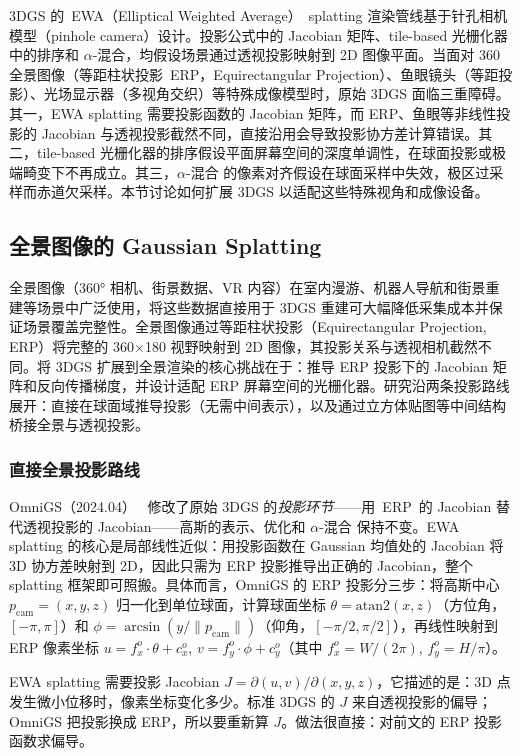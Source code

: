 3DGS 的~EWA（Elliptical Weighted Average）~splatting 渲染管线基于针孔相机模型（pinhole camera）设计。投影公式中的 Jacobian 矩阵、tile-based 光栅化器中的排序和 $\alpha$-混合，均假设场景通过透视投影映射到 2D 图像平面。当面对 360\textdegree{} 全景图像（等距柱状投影~ERP，Equirectangular Projection）、鱼眼镜头（等距投影）、光场显示器（多视角交织）等特殊成像模型时，原始 3DGS 面临三重障碍。其一，EWA splatting 需要投影函数的 Jacobian 矩阵，而 ERP、鱼眼等非线性投影的 Jacobian 与透视投影截然不同，直接沿用会导致投影协方差计算错误。其二，tile-based 光栅化器的排序假设平面屏幕空间的深度单调性，在球面投影或极端畸变下不再成立。其三，$\alpha$-混合 的像素对齐假设在球面采样中失效，极区过采样而赤道欠采样。本节讨论如何扩展 3DGS 以适配这些特殊视角和成像设备。

\subsection{全景图像的 Gaussian Splatting}

全景图像（360° 相机、街景数据、VR 内容）在室内漫游、机器人导航和街景重建等场景中广泛使用，将这些数据直接用于 3DGS 重建可大幅降低采集成本并保证场景覆盖完整性。全景图像通过等距柱状投影（Equirectangular Projection, ERP）将完整的 360\textdegree{}$\times$180\textdegree{} 视野映射到 2D 图像，其投影关系与透视相机截然不同。将 3DGS 扩展到全景渲染的核心挑战在于：推导 ERP 投影下的 Jacobian 矩阵和反向传播梯度，并设计适配 ERP 屏幕空间的光栅化器。研究沿两条投影路线展开：直接在球面域推导投影（无需中间表示），以及通过立方体贴图等中间结构桥接全景与透视投影。

\subsubsection{直接全景投影路线}

OmniGS（2024.04）~\cite{2404_03202} 修改了原始 3DGS 的\emph{投影环节}——用~ERP~的 Jacobian 替代透视投影的 Jacobian——高斯的表示、优化和 $\alpha$-混合 保持不变。EWA splatting 的核心是局部线性近似：用投影函数在 Gaussian 均值处的 Jacobian 将 3D 协方差映射到 2D，因此只需为 ERP 投影推导出正确的 Jacobian，整个 splatting 框架即可照搬。具体而言，OmniGS 的 ERP 投影分三步：将高斯中心 $p_{\text{cam}} = (x, y, z)$ 归一化到单位球面，计算球面坐标 $\theta = \text{atan2}(x, z)$（方位角，$[-\pi, \pi]$）和 $\phi = \arcsin(y/\|p_{\text{cam}}\|)$（仰角，$[-\pi/2, \pi/2]$），再线性映射到 ERP 像素坐标 $u = f_x^o \cdot \theta + c_x^o$, $v = f_y^o \cdot \phi + c_y^o$（其中 $f_x^o = W/(2\pi)$, $f_y^o = H/\pi$）。

EWA splatting 需要投影 Jacobian $J = \partial(u, v)/\partial(x, y, z)$，它描述的是：3D 点发生微小位移时，像素坐标变化多少。标准 3DGS 的 $J$ 来自透视投影的偏导；OmniGS 把投影换成 ERP，所以要重新算 $J$。做法很直接：对前文的 ERP 投影函数求偏导。

